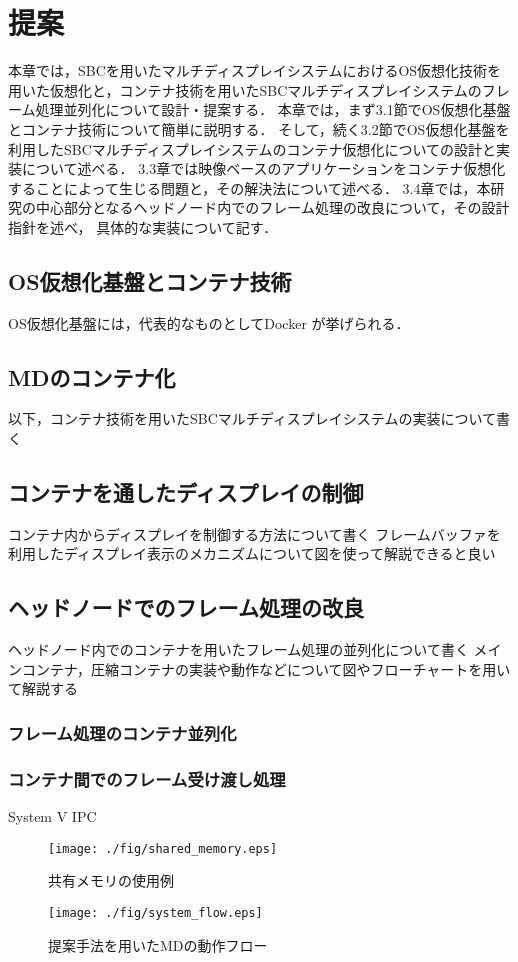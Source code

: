 \chapter{提案}
本章では，SBCを用いたマルチディスプレイシステムにおけるOS仮想化技術を用いた仮想化と，コンテナ技術を用いたSBCマルチディスプレイシステムのフレーム処理並列化について設計・提案する．
本章では，まず3.1節でOS仮想化基盤とコンテナ技術について簡単に説明する．
そして，続く3.2節でOS仮想化基盤を利用したSBCマルチディスプレイシステムのコンテナ仮想化についての設計と実装について述べる．
3.3章では映像ベースのアプリケーションをコンテナ仮想化することによって生じる問題と，その解決法について述べる．
3.4章では，本研究の中心部分となるヘッドノード内でのフレーム処理の改良について，その設計指針を述べ，
具体的な実装について記す．

\section{OS仮想化基盤とコンテナ技術}
OS仮想化基盤には，代表的なものとしてDocker \cite{docker}が挙げられる．


\section{MDのコンテナ化}
以下，コンテナ技術を用いたSBCマルチディスプレイシステムの実装について書く

\section{コンテナを通したディスプレイの制御}
コンテナ内からディスプレイを制御する方法について書く
フレームバッファを利用したディスプレイ表示のメカニズムについて図を使って解説できると良い


\section{ヘッドノードでのフレーム処理の改良}
ヘッドノード内でのコンテナを用いたフレーム処理の並列化について書く
メインコンテナ，圧縮コンテナの実装や動作などについて図やフローチャートを用いて解説する

\subsection*{フレーム処理のコンテナ並列化}
\subsection*{コンテナ間でのフレーム受け渡し処理}
System V IPC \cite{kerrisk2010linux,linux_kernel}
\begin{figure}[H]
    \hspace*{\fill}
    \texttt{[image: ./fig/shared\_memory.eps]}
    \hspace*{\fill}
    \caption{共有メモリの使用例}
   \end{figure}

\begin{figure}[H]
    \hspace*{\fill}
    \texttt{[image: ./fig/system\_flow.eps]}
    \hspace*{\fill}
    \caption{提案手法を用いたMDの動作フロー}
   \end{figure}
